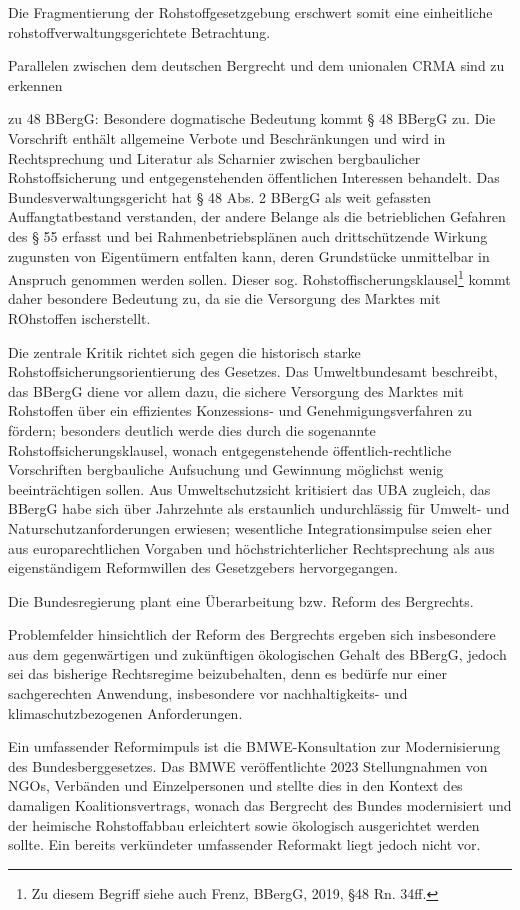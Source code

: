 \documentclass[12pt,a4paper,oneside]{book} %
\begin{document}
Die Fragmentierung der Rohstoffgesetzgebung erschwert somit eine einheitliche rohstoffverwaltungsgerichtete Betrachtung.

Parallelen zwischen dem deutschen Bergrecht und dem unionalen CRMA sind zu erkennen

zu 48 BBergG: Besondere dogmatische Bedeutung kommt § 48 BBergG zu. Die Vorschrift enthält allgemeine Verbote und Beschränkungen und wird in Rechtsprechung und Literatur als Scharnier zwischen bergbaulicher Rohstoffsicherung und entgegenstehenden öffentlichen Interessen behandelt. Das Bundesverwaltungsgericht hat § 48 Abs. 2 BBergG als weit gefassten Auffangtatbestand verstanden, der andere Belange als die betrieblichen Gefahren des § 55 erfasst und bei Rahmenbetriebsplänen auch drittschützende Wirkung zugunsten von Eigentümern entfalten kann, deren Grundstücke unmittelbar in Anspruch genommen werden sollen. Dieser sog. \glqq Rohstoffischerungsklausel\grqq\footnote{Zu diesem Begriff siehe auch Frenz, BBergG, 2019, §48 Rn. 34ff.} kommt daher besondere Bedeutung zu, da sie die Versorgung des Marktes mit ROhstoffen ischerstellt.

Die zentrale Kritik richtet sich gegen die historisch starke Rohstoffsicherungsorientierung des Gesetzes. Das Umweltbundesamt beschreibt, das BBergG diene vor allem dazu, die sichere Versorgung des Marktes mit Rohstoffen über ein effizientes Konzessions- und Genehmigungsverfahren zu fördern; besonders deutlich werde dies durch die sogenannte Rohstoffsicherungsklausel, wonach entgegenstehende öffentlich-rechtliche Vorschriften bergbauliche Aufsuchung und Gewinnung möglichst wenig beeinträchtigen sollen. Aus Umweltschutzsicht kritisiert das UBA zugleich, das BBergG habe sich über Jahrzehnte als erstaunlich undurchlässig für Umwelt- und Naturschutzanforderungen erwiesen; wesentliche Integrationsimpulse seien eher aus europarechtlichen Vorgaben und höchstrichterlicher Rechtsprechung als aus eigenständigem Reformwillen des Gesetzgebers hervorgegangen.

Die Bundesregierung plant eine Überarbeitung bzw. Reform des Bergrechts.

Problemfelder hinsichtlich der Reform des Bergrechts ergeben sich insbesondere aus dem gegenwärtigen und zukünftigen ökologischen Gehalt des BBergG, jedoch sei das bisherige Rechtsregime beizubehalten, denn es bedürfe nur einer sachgerechten Anwendung, insbesondere vor nachhaltigkeits- und klimaschutzbezogenen Anforderungen.\autocite{Frenz 2025, S. 643}

Ein umfassender Reformimpuls ist die BMWE-Konsultation zur Modernisierung des Bundesberggesetzes. Das BMWE veröffentlichte 2023 Stellungnahmen von NGOs, Verbänden und Einzelpersonen und stellte dies in den Kontext des damaligen Koalitionsvertrags, wonach das Bergrecht des Bundes modernisiert und der heimische Rohstoffabbau erleichtert sowie ökologisch ausgerichtet werden sollte. Ein bereits verkündeter umfassender Reformakt liegt jedoch nicht vor.
\end{document}
